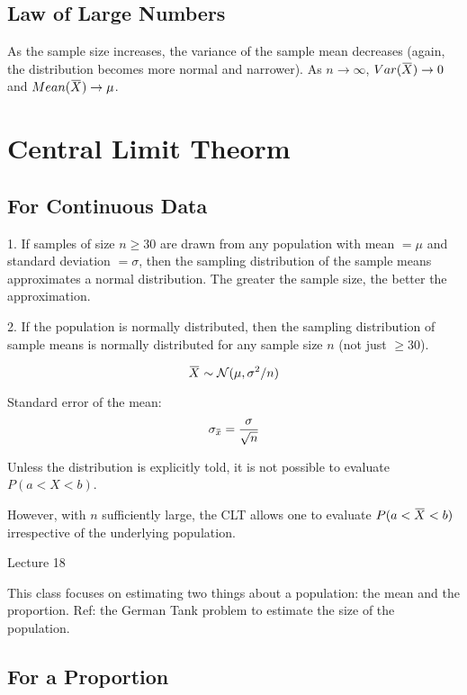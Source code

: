 \documentclass[11pt, oneside]{article}   	%
\newcommand{\overbar}[1]{\mkern 1.5mu\overline{\mkern-1.5mu#1\mkern-1.5mu}\mkern 1.5mu}
\begin{document}
\subsection{Law of Large Numbers}

As the sample size increases, the variance of the sample mean decreases (again, the distribution becomes more normal and narrower). As $n \rightarrow \infty$, $Var(\overbar{X}) \rightarrow 0$ and $Mean(\overbar{X}) \rightarrow \mu$. 


\section{Central Limit Theorm}

\subsection{For Continuous Data}

1. If samples of size $n \geq 30$ are drawn from any population with mean $= \mu$ and standard deviation $= \sigma$, then the sampling distribution of the sample means approximates a normal distribution. The greater the sample size, the better the approximation.

2. If the population is normally distributed, then the sampling distribution of sample means is normally distributed for any sample size $n$ (not just $\geq 30$).

\[
\overbar{X} \sim \mathcal{N}(\mu, \sigma^2 / n)
\]

Standard error of the mean:
\[
\sigma_{\overbar{x}} = \frac{\sigma}{\sqrt{n}}
\]

Unless the distribution is explicitly told, it is not possible to evaluate $P(a < X < b)$.

However, with $n$ sufficiently large, the CLT allows one to evaluate $P(a < \overbar{X} < b)$ irrespective of the underlying population.

Lecture 18

This class focuses on estimating two things about a population: the mean and the proportion. Ref: the German Tank problem to estimate the size of the population.

\subsection{For a Proportion}
\end{document}
